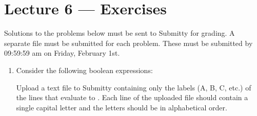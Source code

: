 \documentclass[letterpaper,10pt,english]{sphinxmanual}
\begin{document}
\chapter{Lecture 6 — Exercises}
\label{\detokenize{lecture_notes/lec06_conditionals1_exercises/exercises:lecture-6-exercises}}\label{\detokenize{lecture_notes/lec06_conditionals1_exercises/exercises::doc}}
Solutions to the problems below must be sent to Submitty for grading.
A separate file must be submitted for each problem. These must be
submitted by 09:59:59 am on Friday, February 1st.
\begin{enumerate}
\def\theenumi{\arabic{enumi}}
\def\labelenumi{\theenumi .}
\makeatletter\def\p@enumii{\p@enumi \theenumi .}\makeatother
\item {} 
Consider the following boolean expressions:

\begin{sphinxVerbatim}[commandchars=\\\{\}]
  
  
  
  
  
  
  
  
  

               
          
              
               
              
              
               
\end{sphinxVerbatim}

Upload a text file to Submitty containing only the labels (A, B, C,
etc.) of the lines that evaluate to .  Each line of the
uploaded file should contain a single capital letter and the
letters should be in alphabetical order.


\end{enumerate}
\end{document}
